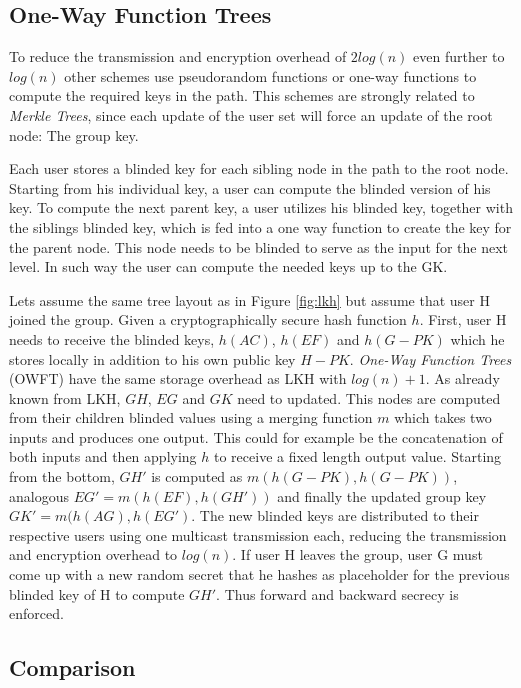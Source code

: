 \subsection{One-Way Function Trees}
To reduce the transmission and encryption overhead of $2 log(n)$ even further to $log(n)$ other schemes use pseudorandom functions \cite{canetti1999multicast} or one-way functions \cite{sherman2003key} to compute the required keys in the path. This schemes are strongly related to \textit{Merkle Trees}, since each update of the user set will force an update of the root node: The group key.

Each user stores a blinded key for each sibling node in the path to the root node. Starting from his individual key, a user can compute the blinded version of his key. To compute the next parent key, a user utilizes his blinded key, together with the siblings blinded key, which is fed into a one way function to create the key for the parent node. This node needs to be blinded to serve as the input for the next level. In such way the user can compute the needed keys up to the GK. 

Lets assume the same tree layout as in Figure \ref{fig:lkh} but assume that user H joined the group. Given a cryptographically secure hash function $h$. First, user H needs to receive the blinded keys, $h(AC)$, $h(EF)$ and $h(G-PK)$ which he stores locally in addition to his own public key $H-PK$. \textit{One-Way Function Trees} (\ac{OWFT}) have the same storage overhead as LKH with $log(n) + 1$.  As already known from LKH, $GH$, $EG$ and $GK$ need to updated. This nodes are computed from their children blinded values using a merging function $m$ which takes two inputs and produces one output. This could for example be the concatenation of both inputs and then applying $h$ to receive a fixed length output value. Starting from the bottom,  $GH'$ is computed as $m(h(G-PK), h(G-PK))$, analogous $EG' = m(h(EF), h(GH'))$ and finally the updated group key $GK' = m(h(AG), h(EG')$. The new blinded keys are distributed to their respective users using one multicast transmission each, reducing the transmission and encryption overhead to $log(n)$. If user H leaves the group, user G must come up with a new random secret that he hashes as placeholder for the previous blinded key of H to compute $GH'$. Thus forward and backward secrecy is enforced.


\subsection{Comparison}  


